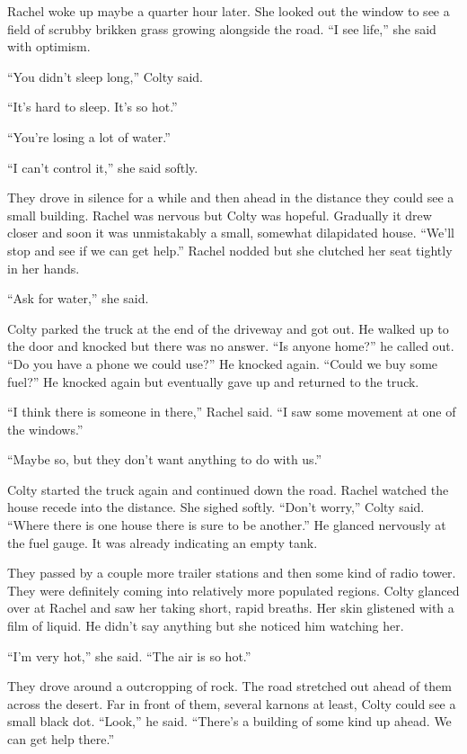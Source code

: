 Rachel woke up maybe a quarter hour later. She looked out the window to see a field of scrubby
brikken grass growing alongside the road. ``I see life,'' she said with optimism.

``You didn't sleep long,'' Colty said.

``It's hard to sleep. It's so hot.''

``You're losing a lot of water.''

``I can't control it,'' she said softly.

They drove in silence for a while and then ahead in the distance they could see a small
building. Rachel was nervous but Colty was hopeful. Gradually it drew closer and soon it was
unmistakably a small, somewhat dilapidated house. ``We'll stop and see if we can get help.''
Rachel nodded but she clutched her seat tightly in her hands.

``Ask for water,'' she said.

Colty parked the truck at the end of the driveway and got out. He walked up to the door and
knocked but there was no answer. ``Is anyone home?'' he called out. ``Do you have a phone we
could use?'' He knocked again. ``Could we buy some fuel?'' He knocked again but eventually gave
up and returned to the truck.

``I think there is someone in there,'' Rachel said. ``I saw some movement at one of the
windows.''

``Maybe so, but they don't want anything to do with us.''

Colty started the truck again and continued down the road. Rachel watched the house recede into
the distance. She sighed softly. ``Don't worry,'' Colty said. ``Where there is one house there
is sure to be another.'' He glanced nervously at the fuel gauge. It was already indicating an
empty tank.

They passed by a couple more trailer stations and then some kind of radio tower. They were
definitely coming into relatively more populated regions. Colty glanced over at Rachel and saw
her taking short, rapid breaths. Her skin glistened with a film of liquid. He didn't say
anything but she noticed him watching her.

``I'm very hot,'' she said. ``The air is so hot.''

They drove around a outcropping of rock. The road stretched out ahead of them across the desert.
Far in front of them, several karnons at least, Colty could see a small black dot. ``Look,'' he
said. ``There's a building of some kind up ahead. We can get help there.''

